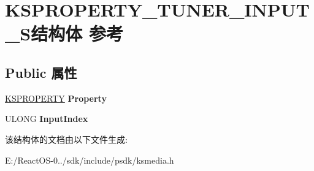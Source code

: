 \hypertarget{struct_k_s_p_r_o_p_e_r_t_y___t_u_n_e_r___i_n_p_u_t___s}{}\section{K\+S\+P\+R\+O\+P\+E\+R\+T\+Y\+\_\+\+T\+U\+N\+E\+R\+\_\+\+I\+N\+P\+U\+T\+\_\+\+S结构体 参考}
\label{struct_k_s_p_r_o_p_e_r_t_y___t_u_n_e_r___i_n_p_u_t___s}
\subsection*{Public 属性}
\begin{DoxyCompactItemize}
\item 
\mbox{\label{struct_k_s_p_r_o_p_e_r_t_y___t_u_n_e_r___i_n_p_u_t___s_ac63100c3dc0152d45a8b00bcc6e1df49}} 
\hyperlink{struct_k_s_i_d_e_n_t_i_f_i_e_r}{K\+S\+P\+R\+O\+P\+E\+R\+TY} {\bfseries Property}
\item 
\mbox{\label{struct_k_s_p_r_o_p_e_r_t_y___t_u_n_e_r___i_n_p_u_t___s_ab7c632a52a7e4bf6ee19a6a67ff928ff}} 
U\+L\+O\+NG {\bfseries Input\+Index}
\end{DoxyCompactItemize}


该结构体的文档由以下文件生成\+:\begin{DoxyCompactItemize}
\item 
E\+:/\+React\+O\+S-\/0../sdk/include/psdk/ksmedia.\+h\end{DoxyCompactItemize}
